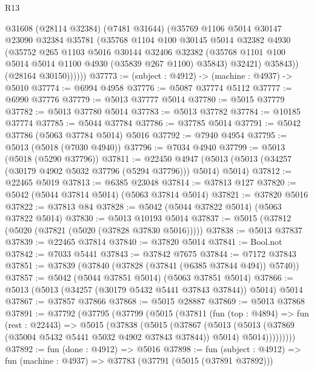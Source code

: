 \begin{lexlean}{R13}
\begin{coremodule}
              @31608
              (@28114 @32384)
              (@7481 @31644)
              (@35769
                @1106
                @5014
                @30147
                @23090
                @32384
                @35781
                (@35768
                  @1104
                  @100
                  @30145
                  @5014
                  @32382
                  @4930
                  (@35752
                    @265
                    @1103
                    @5016
                    @30144
                    @32406
                    @32382
                    (@35768 @1101 @100 @5014 @5014 @1100 @4930 (@35839 @267 @1100) @35843)
                    @32421)
                  @35843))
              (@28164 @30150))))))
@37773 := (subject : @4912) -> (machine : @4937) -> @5010
@37774 := @6994 @4958
@37776 := @5087 @37774 @5112
@37777 := @6990 @37776
@37779 := @5013 @37777 @5014
@37780 := @5015 @37779
@37782 := @5013 @37780 @5014
@37783 := @5013 @37782
@37784 := @10185 @37774
@37785 := @5044 @37784
@37786 := @37785 @5014
@37791 := @5042 @37786 (@5063 @37784 @5014) @5016
@37792 := @7940 @4954
@37795 := @5013 (@5018 (@7030 @4940))
@37796 := @7034 @4940
@37799 := @5013 (@5018 (@5290 @37796))
@37811 := @22450
    @4947
    (@5013 (@5013 (@34257 (@30179 @4902 @5032 @37796 (@5294 @37796))) @5014) @5014)
@37812 := @22465 @5019
@37813 := @6385 @23048
@37814 := @37813 @127
@37820 := @5042 (@5044 @37814 @5014) (@5063 @37814 @5014)
@37821 := @37820 @5016
@37822 := @37813 @84
@37828 := @5042 (@5044 @37822 @5014) (@5063 @37822 @5014)
@37830 := @5013 @10193 @5014
@37837 := @5015 (@37812 (@5020 (@37821 (@5020 (@37828 @37830 @5016)))))
@37838 := @5013 @37837
@37839 := @22465 @37814
@37840 := @37820 @5014
@37841 := Bool.not
@37842 := @7033 @5441
@37843 := @37842 @7675
@37844 := @7172 @37843
@37851 := @37839 (@37840 (@37828 (@37841 (@6385 @37844 @494)) @5740))
@37857 := @5042 (@5044 @37851 @5014) (@5063 @37851 @5014)
@37866 := @5013 (@5013 (@34257 (@30179 @5432 @5441 @37843 @37844)) @5014) @5014
@37867 := @37857 @37866
@37868 := @5015 @28887
@37869 := @5013 @37868
@37891 := @37792
    (@37795
      (@37799
        (@5015
          (@37811
            (fun (top : @4894) =>
            fun (rest : @22443) =>
            @5015
              (@37838
                (@5015
                  (@37867
                    (@5013
                      (@5013 (@37869 (@35004 @5432 @5441 @5032 @4902 @37843 @37844)) @5014)
                      @5014)))))))))
@37892 := fun (done : @4912) => @5016
@37898 := fun (subject : @4912) => fun (machine : @4937) => @37783 (@37791 (@5015 (@37891 @37892)))

\end{coremodule}
\end{lexlean}

